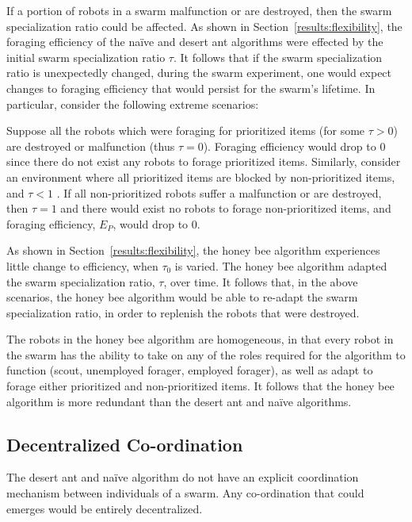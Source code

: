 If a portion of robots in a swarm malfunction or are destroyed, then the swarm specialization ratio could be affected. As shown in Section~\ref{results:flexibility}, the foraging efficiency of the na\"ive and desert ant algorithms were effected by the initial swarm specialization ratio $\tau$. It follows that if the swarm specialization ratio is unexpectedly changed, during the swarm experiment, one would expect changes to foraging efficiency that would persist for the swarm's lifetime. In particular, consider the following extreme scenarios: 

Suppose all the robots which were foraging for prioritized items (for some $\tau > 0$) are destroyed or malfunction (thus $\tau=0$). Foraging efficiency would drop to 0 since there do not exist any robots to forage prioritized items. Similarly, consider an environment where all prioritized items are blocked by non-prioritized items, and $\tau < 1$ . If all non-prioritized robots suffer a malfunction or are destroyed, then $\tau=1$ and there would exist no robots to forage non-prioritized items, and foraging efficiency, $E_P$, would drop to 0. 

As shown in Section~\ref{results:flexibility}, the honey bee algorithm experiences little change to efficiency, when $\tau_0$ is varied. The honey bee algorithm adapted the swarm specialization ratio, $\tau$, over time. It follows that, in the above scenarios, the honey bee algorithm would be able to re-adapt the swarm specialization ratio, in order to replenish the robots that were destroyed. 

The robots in the honey bee algorithm are homogeneous, in that every robot in the swarm has the ability to take on any of the roles required for the algorithm to function (scout, unemployed forager, employed forager), as well as adapt to forage either prioritized and non-prioritized items. It follows that the honey bee algorithm is more redundant than the desert ant and na\"ive algorithms.

\subsection{Decentralized Co-ordination}
\label{results:decentralizedcoordination}


The desert ant and na\"ive algorithm do not have an explicit coordination mechanism between individuals of a swarm. Any co-ordination that could emerges would be entirely decentralized. 

